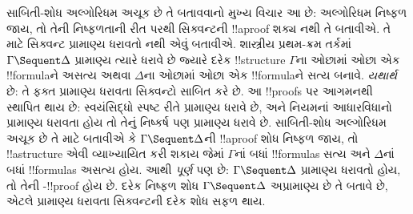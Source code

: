\documentclass[../../../include/open-logic-section]{subfiles}
\begin{document}
સાબિતી-શોધ
અલ્ગોરિધમ
અચૂક છે
તે બતાવવાનો
મુખ્ય વિચાર
આ છે: અલ્ગોરિધમ
નિષ્ફળ જાય,
તો તેની
નિષ્ફળતાની
રીત પરથી
સિક્વન્ટની
!!a{proof}
શક્ય નથી
તે બતાવીએ.
તે માટે
સિક્વન્ટ
પ્રામાણ્ય ધરાવતો નથી
એવું બતાવીએ.
શાસ્ત્રીય
પ્રથમ-ક્રમ
તર્કમાં
$\Gamma \Sequent \Delta$
પ્રામાણ્ય ત્યારે ધરાવે છે
જ્યારે
દરેક
!!{structure}
$\Gamma$ના
ઓછામાં ઓછા
એક !!{formula}ને
અસત્ય અથવા
$\Delta$ના
ઓછામાં ઓછા
એક !!{formula}ને
સત્ય બનાવે.
\emph{યથાર્થ}
છે: તે ફક્ત
પ્રામાણ્ય ધરાવતા
સિક્વન્ટો
સાબિત
કરે છે.
આ !!{proof}s
પર આગમનથી
સ્થાપિત થાય
છે: સ્વયંસિદ્ધો
સ્પષ્ટ રીતે
પ્રામાણ્ય ધરાવે છે,
અને નિયમનાં
આધારવિધાનો
પ્રામાણ્ય ધરાવતા હોય
તો તેનું
નિષ્કર્ષ પણ
પ્રામાણ્ય ધરાવે છે.
સાબિતી-શોધ
અલ્ગોરિધમ
અચૂક છે
તે માટે
બતાવીએ કે
$\Gamma \Sequent \Delta$ની
!!a{proof}
શોધ નિષ્ફળ
જાય, તો
!!a{structure}
એવી વ્યાખ્યાયિત
કરી શકાય
જેમાં
$\Gamma$નાં
બધાં
!!{formula}s
સત્ય અને
$\Delta$નાં
બધાં
!!{formula}s
અસત્ય હોય.
આથી
\emph{પૂર્ણ}
પણ છે:
$\Gamma \Sequent \Delta$
પ્રામાણ્ય ધરાવતો
હોય, તો
તેની
-!!{proof}
હોય છે.
દરેક નિષ્ફળ
શોધ
$\Gamma \Sequent \Delta$
અપ્રામાણ્ય
છે તે બતાવે
છે, એટલે
પ્રામાણ્ય ધરાવતા
સિક્વન્ટની
દરેક શોધ
સફળ થાય.
\end{document}
